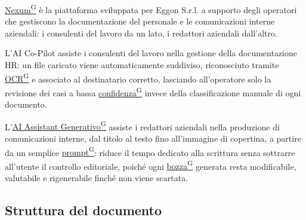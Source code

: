 \documentclass[a4paper,12pt]{article}
\providecommand{\glslink}[2]{\href{https://alittlebyte-19.github.io/Documentazione/glossario.html\#gls-#1}{\underline{#2}\textsuperscript{\scriptsize G}}}
\begin{document}
\glslink{nexum}{Nexum} è la piattaforma sviluppata per Eggon S.r.l. a supporto degli operatori che gestiscono la documentazione del personale e le comunicazioni interne aziendali: i consulenti del lavoro da un lato, i redattori aziendali dall'altro.

L'AI Co-Pilot assiste i consulenti del lavoro nella gestione della documentazione HR: un file caricato viene automaticamente suddiviso, riconosciuto tramite \glslink{ocr-riconoscimento-ottico-dei-caratteri}{OCR} e associato al destinatario corretto, lasciando all'operatore solo la revisione dei casi a bassa \glslink{confidenza-confidence-score}{confidenza} invece della classificazione manuale di ogni documento.

L'\glslink{ai-assistant-generativo}{AI Assistant Generativo} assiste i redattori aziendali nella produzione di comunicazioni interne, dal titolo al testo fino all'immagine di copertina, a partire da un semplice \glslink{prompt}{prompt}: riduce il tempo dedicato alla scrittura senza sottrarre all'utente il controllo editoriale, poiché ogni \glslink{bozza-draft}{bozza} generata resta modificabile, valutabile e rigenerabile finché non viene scartata.

\subsection{Struttura del documento}
\end{document}
